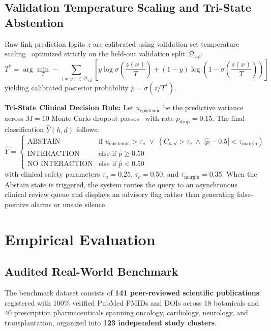 \documentclass[10pt,journal,compsoc]{IEEEtran}
\begin{document}
\subsection{Validation Temperature Scaling and Tri-State Abstention}
Raw link prediction logits $z$ are calibrated using validation-set temperature scaling~\cite{guo2017calibration} optimized strictly on the held-out validation split $\mathcal{D}_{\text{val}}$:
\begin{equation}
T^* = \arg\min_T -\sum_{(x, y) \in \mathcal{D}_{\text{val}}} \left[ y \log \sigma\left(\frac{z(x)}{T}\right) + (1-y) \log\left(1 - \sigma\left(\frac{z(x)}{T}\right)\right) \right]
\end{equation}
yielding calibrated posterior probability $\hat{p} = \sigma(z / T^*)$.

\textbf{Tri-State Clinical Decision Rule:} Let $u_{\text{epistemic}}$ be the predictive variance across $M=10$ Monte Carlo dropout passes~\cite{gal2016dropout} with rate $p_{\text{drop}} = 0.15$. The final classification $\hat{Y}(h, d)$ follows:
\begin{equation}
\hat{Y} = \begin{cases}
\text{ABSTAIN} & \text{if } u_{\text{epistemic}} > \tau_u \;\lor\; \left( C_{h,d} > \tau_c \;\land\; |\hat{p} - 0.5| < \tau_{\text{margin}} \right) \\
\text{INTERACTION} & \text{else if } \hat{p} \ge 0.50 \\
\text{NO INTERACTION} & \text{else if } \hat{p} < 0.50
\end{cases}
\end{equation}
with clinical safety parameters $\tau_u = 0.25$, $\tau_c = 0.50$, and $\tau_{\text{margin}} = 0.35$. When the Abstain state is triggered, the system routes the query to an asynchronous clinical review queue and displays an advisory flag rather than generating false-positive alarms or unsafe silence.

\section{Empirical Evaluation}

\subsection{Audited Real-World Benchmark}
The benchmark dataset consists of \textbf{141 peer-reviewed scientific publications} registered with 100\% verified PubMed PMIDs and DOIs across 18 botanicals and 40 prescription pharmaceuticals spanning oncology, cardiology, neurology, and transplantation, organized into \textbf{123 independent study clusters}. 
\end{document}
